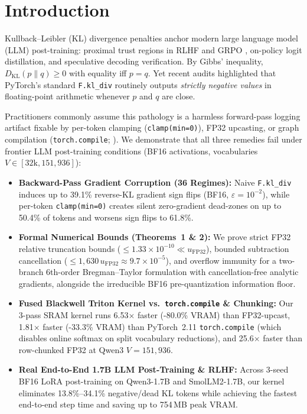 \documentclass[10pt]{article}
\newcommand{\KL}{D_{\mathrm{KL}}}
\begin{document}
\section{Introduction}
Kullback--Leibler (KL) divergence penalties anchor modern large language model (LLM) post-training: proximal trust regions in RLHF \citep{ouyang2022instructgpt} and GRPO \citep{shao2024deepseekmath}, on-policy logit distillation, and speculative decoding verification. By Gibbs' inequality, $\KL(p \parallel q) \ge 0$ with equality iff $p = q$. Yet recent audits \citep{klnegative2026} highlighted that PyTorch's standard \texttt{F.kl\_div} routinely outputs \emph{strictly negative values} in floating-point arithmetic whenever $p$ and $q$ are close.

Practitioners commonly assume this pathology is a harmless forward-pass logging artifact fixable by per-token clamping (\texttt{clamp(min=0)}), FP32 upcasting, or graph compilation (\texttt{torch.compile}; \citealt{ansel2024pytorch2}). We demonstrate that all three remedies fail under frontier LLM post-training conditions (BF16 activations, vocabularies $V \in [32\text{k}, 151{,}936]$):
\begin{itemize}
  \item \textbf{Backward-Pass Gradient Corruption (36 Regimes):} Naive \texttt{F.kl\_div} induces up to 39.1\% reverse-KL gradient sign flips (BF16, $\varepsilon=10^{-2}$), while per-token \texttt{clamp(min=0)} creates silent zero-gradient dead-zones on up to 50.4\% of tokens and worsens sign flips to 61.8\%.
  \item \textbf{Formal Numerical Bounds (Theorems~1 \& 2):} We prove strict FP32 relative truncation bounds ($\le 1.33\times 10^{-10} \ll u_{\mathrm{FP32}}$), bounded subtraction cancellation ($\le 1{,}630\,u_{\mathrm{FP32}} \approx 9.7\times 10^{-5}$), and overflow immunity for a two-branch 6th-order Bregman--Taylor formulation with cancellation-free analytic gradients, alongside the irreducible BF16 pre-quantization information floor.
  \item \textbf{Fused Blackwell Triton Kernel vs.\ \texttt{torch.compile} \& Chunking:} Our 3-pass SRAM kernel runs 6.53$\times$ faster (-80.0\% VRAM) than FP32-upcast, 1.81$\times$ faster (-33.3\% VRAM) than PyTorch~2.11 \texttt{torch.compile} (which disables online softmax on split vocabulary reductions), and 25.6$\times$ faster than row-chunked FP32 at Qwen3 $V=151{,}936$.
  \item \textbf{Real End-to-End 1.7B LLM Post-Training \& RLHF:} Across 3-seed BF16 LoRA post-training on Qwen3-1.7B and SmolLM2-1.7B, our kernel eliminates 13.8\%--34.1\% negative/dead KL tokens while achieving the fastest end-to-end step time and saving up to 754\,MB peak VRAM.
\end{itemize}
\end{document}
